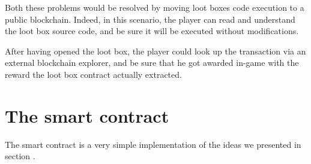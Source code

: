 \documentclass[12pt]{article}
\begin{document}
Both these problems would be resolved by moving loot boxes code execution to a public blockchain. Indeed, in this scenario, the player can read and understand the loot box source code, and be sure it will be executed without modifications.

After having opened the loot box, the player could look up the transaction via an external blockchain explorer, and be sure that he got awarded in-game with the reward the loot box contract actually extracted.

\section{The smart contract} \label{section:the_smart_contract}
The smart contract is a very simple implementation of the ideas we presented in section .
\end{document}
